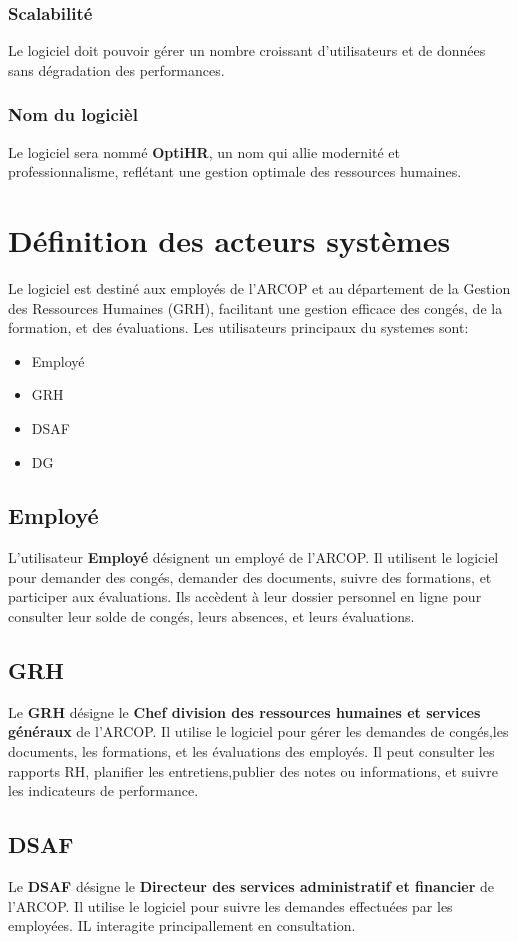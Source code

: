 \subsubsection{Scalabilité}
Le logiciel doit pouvoir gérer un nombre croissant d'utilisateurs et de données sans dégradation des performances.


\subsubsection{Nom du logicièl}
Le logiciel sera nommé \textbf{OptiHR}, un nom qui allie modernité et professionnalisme, reflétant une gestion
optimale des ressources humaines.


\section{Définition des acteurs systèmes}
Le logiciel est destiné aux employés de l’ARCOP et au département de la Gestion des Ressources Humaines (GRH), facilitant une gestion efficace des congés, de la formation, et des évaluations.
Les utilisateurs principaux du systemes sont:
\begin{itemize}
    \item Employé 
    \item GRH 
    \item DSAF 
    \item DG 
\end{itemize}
\subsection{Employé}
L'utilisateur \textbf{Employé} désignent un employé de l'ARCOP. Il utilisent le logiciel pour demander des congés, demander des documents, suivre des formations, et participer aux évaluations. Ils accèdent à leur dossier personnel en ligne pour consulter leur solde de congés, leurs absences, et leurs évaluations.
\subsection{GRH}
Le \textbf{GRH} désigne le \textbf{Chef division des ressources humaines et services généraux} de l'ARCOP. Il utilise le logiciel pour gérer les demandes de congés,les documents, les formations, et les évaluations des employés. Il peut consulter les rapports RH, planifier les entretiens,publier des notes ou informations, et suivre les indicateurs de performance.
\subsection{DSAF }
Le \textbf{DSAF} désigne le \textbf{ Directeur des services administratif et financier} de l'ARCOP. Il utilise le logiciel pour suivre les demandes effectuées par les employées. IL interagite principallement en consultation.
